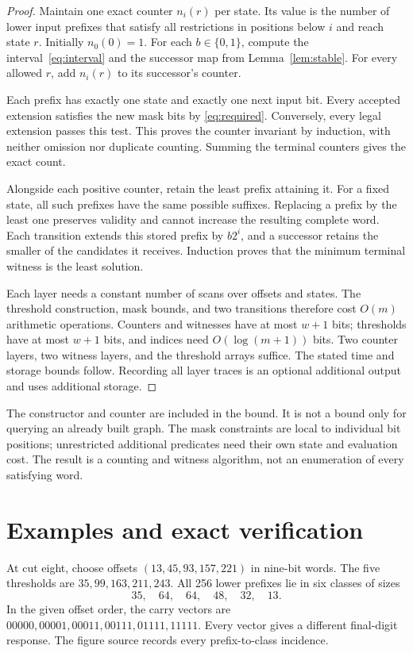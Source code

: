 \documentclass[11pt,a4paper]{article}
\newcommand{\bits}{\{0,1\}}
\begin{document}
\begin{proof}
Maintain one exact counter $n_i(r)$ per state.
Its value is the number of lower input prefixes that satisfy all restrictions
in positions below $i$ and reach state $r$.
Initially $n_0(0)=1$.
For each $b\in\bits$, compute the interval~\eqref{eq:interval} and the
successor map from Lemma~\ref{lem:stable}.
For every allowed $r$, add $n_i(r)$ to its successor's counter.

Each prefix has exactly one state and exactly one next input bit.
Every accepted extension satisfies the new mask bits by
\eqref{eq:required}. Conversely, every legal extension passes this test.
This proves the counter invariant by induction, with neither omission nor
duplicate counting. Summing the terminal counters gives the exact count.

Alongside each positive counter, retain the least prefix attaining it.
For a fixed state, all such prefixes have the same possible suffixes.
Replacing a prefix by the least one preserves validity and cannot increase
the resulting complete word. Each transition extends this stored prefix by
$b2^i$, and a successor retains the smaller of the candidates it receives.
Induction proves that the minimum terminal witness is the least solution.

Each layer needs a constant number of scans over offsets and states.
The threshold construction, mask bounds, and two transitions therefore cost
$O(m)$ arithmetic operations. Counters and witnesses have at most $w+1$ bits;
thresholds have at most $w+1$ bits, and indices need $O(\log(m+1))$ bits.
Two counter layers, two witness layers, and the threshold arrays suffice.
The stated time and storage bounds follow. Recording all layer traces is an
optional additional output and uses additional storage.
\end{proof}

The constructor and counter are included in the bound. It is not a bound
only for querying an already built graph. The mask constraints are local to
individual bit positions; unrestricted additional predicates need their own
state and evaluation cost. The result is a counting and witness algorithm,
not an enumeration of every satisfying word.

\section{Examples and exact verification}
At cut eight, choose offsets $(13,45,93,157,221)$ in nine-bit words.
The five thresholds are $35,99,163,211,243$.
All 256 lower prefixes lie in six classes of sizes
\[
 35,\quad64,\quad64,\quad48,\quad32,\quad13.
\]
In the given offset order, the carry vectors are
$00000,00001,00011,00111,01111,11111$.
Every vector gives a different final-digit response. The figure source
records every prefix-to-class incidence.
\end{document}
